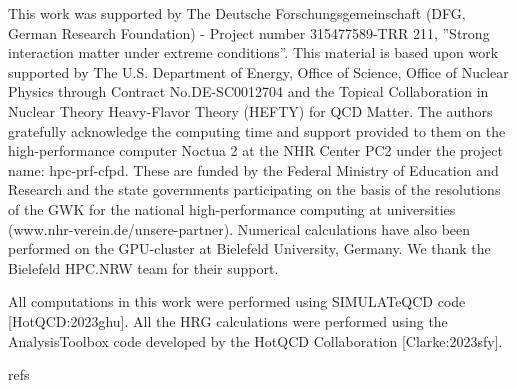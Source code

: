 \documentclass[11pt,a4paper]{article}
\begin{document}
This work was supported by The Deutsche Forschungsgemeinschaft (DFG, German Research Foundation) - Project number 315477589-TRR 211, ”Strong interaction matter under extreme conditions”. This material is based upon work supported by The U.S. Department of Energy, Office of Science, Office of Nuclear Physics through Contract No.DE-SC0012704 and the Topical Collaboration in Nuclear Theory Heavy-Flavor Theory (HEFTY) for QCD Matter. The authors gratefully acknowledge the computing time and support provided to them on the high-performance computer Noctua 2 at the NHR Center PC2 under the project name: hpc-prf-cfpd. These are funded by the Federal Ministry of Education and Research and the state governments participating on the basis of the resolutions of the GWK for the national high-performance computing at universities (www.nhr-verein.de/unsere-partner). Numerical calculations have also been performed on the GPU-cluster at Bielefeld University, Germany. We thank the Bielefeld HPC.NRW team for their support.

All computations in this work were performed using SIMULATeQCD code [HotQCD:2023ghu]. All the HRG calculations were performed using the AnalysisToolbox code developed by the HotQCD Collaboration [Clarke:2023sfy].

refs
\end{document}
